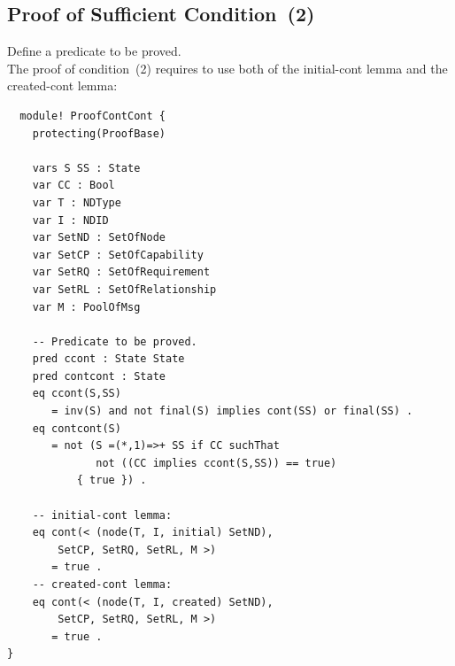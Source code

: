 \documentclass[12pt]{report}
\begin{document}
\subsection{Proof of Sufficient Condition~(2)}
\label{sec:TOSCAcontcont}
 Define a predicate to be proved. \\ 
The proof of condition~(2) requires to use both of the
initial-cont lemma and the created-cont lemma:
\small
\begin{verbatim}
  module! ProofContCont {
    protecting(ProofBase)
  
    vars S SS : State
    var CC : Bool
    var T : NDType
    var I : NDID
    var SetND : SetOfNode
    var SetCP : SetOfCapability
    var SetRQ : SetOfRequirement
    var SetRL : SetOfRelationship
    var M : PoolOfMsg
  
    -- Predicate to be proved.
    pred ccont : State State
    pred contcont : State
    eq ccont(S,SS)
       = inv(S) and not final(S) implies cont(SS) or final(SS) .
    eq contcont(S)
       = not (S =(*,1)=>+ SS if CC suchThat
              not ((CC implies ccont(S,SS)) == true)
           { true }) .
  
    -- initial-cont lemma: 
    eq cont(< (node(T, I, initial) SetND), 
  	    SetCP, SetRQ, SetRL, M >)
       = true .
    -- created-cont lemma:
    eq cont(< (node(T, I, created) SetND), 
  	    SetCP, SetRQ, SetRL, M >)
       = true .
}
\end{verbatim}
\normalsize
\end{document}
